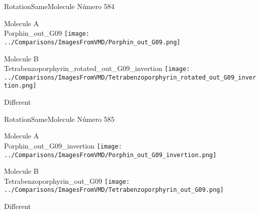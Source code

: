 \vtab[-3cm]
\begin{center}
{\large RotationSameMolecule \tab Número 584}
\end{center}
\begin{multicols}{2}
\begin{center}
Molecule A \\ 
Porphin\_out\_G09
\texttt{[image: ../Comparisons/ImagesFromVMD/Porphin\_out\_G09.png]}
\\
\vtab

\columnbreak
Molecule B \\ 
Tetrabenzoporphyrin\_rotated\_out\_G09\_invertion
\texttt{[image: ../Comparisons/ImagesFromVMD/Tetrabenzoporphyrin\_rotated\_out\_G09\_invertion.png]}
\\
\vtab


\end{center}
\end{multicols}
\begin{center}
\textcolor{NavyBlue}{\Large Different}
\end{center}

 \newpage

\vtab[-3cm]
\begin{center}
{\large RotationSameMolecule \tab Número 585}
\end{center}
\begin{multicols}{2}
\begin{center}
Molecule A \\ 
Porphin\_out\_G09\_invertion
\texttt{[image: ../Comparisons/ImagesFromVMD/Porphin\_out\_G09\_invertion.png]}
\\
\vtab

\columnbreak
Molecule B \\ 
Tetrabenzoporphyrin\_out\_G09
\texttt{[image: ../Comparisons/ImagesFromVMD/Tetrabenzoporphyrin\_out\_G09.png]}
\\
\vtab


\end{center}
\end{multicols}
\begin{center}
\textcolor{NavyBlue}{\Large Different}
\end{center}

 \newpage

